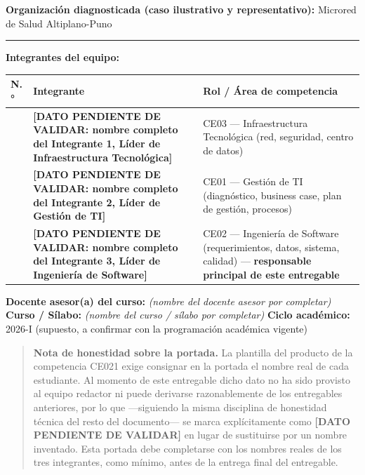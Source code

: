 \documentclass[11pt,a4paper]{article}
\begin{document}
\textbf{Organización diagnosticada (caso ilustrativo y representativo):} Microred de Salud Altiplano-Puno

\begin{center}\rule{0.5\linewidth}{0.5pt}\end{center}

\textbf{Integrantes del equipo:}

{\small
\begin{longtable}[]{@{}
  >{\raggedright\arraybackslash}p{}
  >{\raggedright\arraybackslash}p{}
  >{\raggedright\arraybackslash}p{}@{}}
\toprule\noalign{}
\begin{minipage}[b]{\linewidth}\raggedright
N.°
\end{minipage} & \begin{minipage}[b]{\linewidth}\raggedright
Integrante
\end{minipage} & \begin{minipage}[b]{\linewidth}\raggedright
Rol / Área de competencia
\end{minipage} \\
\midrule\noalign{}
\endhead
\bottomrule\noalign{}
\endlastfoot
1 & \textbf{{[}DATO PENDIENTE DE VALIDAR: nombre completo del Integrante 1, Líder de Infraestructura Tecnológica{]}} & CE03 --- Infraestructura Tecnológica (red, seguridad, centro de datos) \\
2 & \textbf{{[}DATO PENDIENTE DE VALIDAR: nombre completo del Integrante 2, Líder de Gestión de TI{]}} & CE01 --- Gestión de TI (diagnóstico, business case, plan de gestión, procesos) \\
3 & \textbf{{[}DATO PENDIENTE DE VALIDAR: nombre completo del Integrante 3, Líder de Ingeniería de Software{]}} & CE02 --- Ingeniería de Software (requerimientos, datos, sistema, calidad) --- \textbf{responsable principal de este entregable} \\
\end{longtable}
}

\textbf{Docente asesor(a) del curso:} \textit{(nombre del docente asesor por completar)}
\textbf{Curso / Sílabo:} \textit{(nombre del curso / s\'ilabo por completar)}
\textbf{Ciclo académico:} 2026-I (supuesto, a confirmar con la programación académica vigente)

\begin{quote}
\textbf{Nota de honestidad sobre la portada.} La plantilla del producto de la competencia CE021 exige consignar en la portada el nombre real de cada estudiante. Al momento de este entregable dicho dato no ha sido provisto al equipo redactor ni puede derivarse razonablemente de los entregables anteriores, por lo que ---siguiendo la misma disciplina de honestidad técnica del resto del documento--- se marca explícitamente como \textbf{{[}DATO PENDIENTE DE VALIDAR{]}} en lugar de sustituirse por un nombre inventado. Esta portada debe completarse con los nombres reales de los tres integrantes, como mínimo, antes de la entrega final del entregable.
\end{quote}
\end{document}
